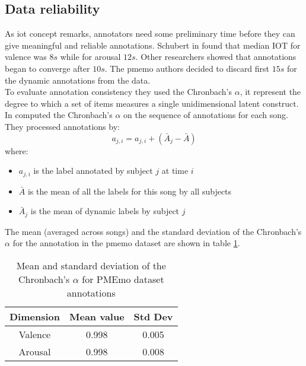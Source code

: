 \subsection{Data reliability}
As \gls{iot} concept remarks, annotators need some preliminary time before they can give meaningful and reliable annotations. Schubert in \cite{schubert2013reliability} found that median IOT for valence was $8s$ while for arousal $12s$. Other researchers showed that annotations began to converge after $10s$. The \gls{pmemo} authors decided to discard first $15s$ for the dynamic annotations from the data.
\\ \indent
To evaluate annotation consistency they used the Chronbach's $\alpha$, it represent the degree to which a set of items measures a single unidimensional latent construct. In \cite{zhang2018pmemo} computed the Chronbach's $\alpha$ on the sequence of annotations for each song.
\\
They processed annotations by:
\begin{equation}
	a_{j,i}=a_{j,i}+(\bar{A}_j-\bar{A})
\end{equation}
where:
\begin{itemize}
	\item $a_{j,i}$ is the label annotated by subject $j$ at time $i$
	\item $\bar{A}$ is the mean of all the labels for this song by all subjects
	\item $\bar{A}_j$ is the mean of dynamic labels by subject $j$
\end{itemize}
The mean (averaged across songs) and the standard deviation of the Chronbach's $\alpha$ for the annotation in the \gls{pmemo} dataset are shown in table \ref{table:Chronbach}.
\begin{table}[h!]
	\centering
	\begin{tabular}{|c|c|c|}
		\hline
		Dimension & Mean value & Std Dev \\ [0.5ex] 
		\hline\hline Valence & 0.998 & 0.005 \\ 
		\hline Arousal & 0.998 & 0.008 \\ 
		\hline
	\end{tabular}
	\caption{Mean and standard deviation of the Chronbach's $\alpha$ for PMEmo dataset annotations}
	\label{table:Chronbach}
\end{table}

